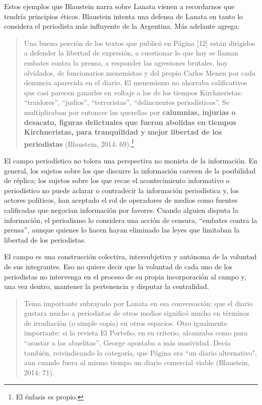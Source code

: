 {Estos ejemplos que Blaustein narra sobre Lanata vienen a recordarnos que tendría principios éticos. Blaustein intenta una defensa de Lanata en tanto lo considera el periodista más influyente de la Argentina. Más adelante agrega:

\begin{quote}
Una buena porción de los textos que publicó en Página {[}12{]} están dirigidos a defender la libertad de expresión, a cuestionar lo que hoy se llaman embates contra la prensa, a responder las agresiones brutales, hoy olvidados, de funcionarios menemistas y del propio Carlos Menen por cada denuncia aparecida en el diario. El menemismo no ahorraba calificativos que casi parecen ganarles en voltaje a los de los tiempos Kirchneristas: ``traidores'', ``judíos'', ``terroristas'', ``delincuentes periodísticos''. Se multiplicaban por entonces las querellas por \textbf{calumnias, injurias o desacato, figuras delictuales que fueron abolidas en tiempos Kirchneristas, para tranquilidad y mejor libertad de los periodistas} (Blaustein, 2014: 69).\footnote{El énfasis es propio.}
\end{quote}

El campo periodístico no tolera una perspectiva no monista de la información. En general, los sujetos sobre los que discurre la información carecen de la posibilidad de réplica; los sujetos sobre los que recae el acontecimiento informativo o periodístico no puede aclarar o contradecir la información periodística y, los actores políticos, han aceptado el rol de operadores de medios como fuentes calificadas que negocian información por favores. Cuando alguien disputa la información, el periodismo lo considera una acción de censura, ``embates contra la prensa'', aunque quienes lo hacen hayan eliminado las leyes que limitaban la libertad de los periodistas.

El campo es una construcción colectiva, intersubjetiva y autónoma de la voluntad de sus integrantes. Eso no quiere decir que la voluntad de cada uno de los periodistas no intervenga en el proceso de su propia incorporación al campo y, una vez dentro, mantener la pertenencia y disputar la centralidad.

\begin{quote}
Tema importante subrayado por Lanata en esa conversación: que el diario gustara mucho a periodistas de otros medios significó mucho en términos de irradiación (o simple copia) en otros espacios. Otro igualmente importante: si la revista El Porteño, en su criterio, alcanzaba como para ``asustar a las abuelitas'', George apostaba a más masividad. Decía también, reivindicando la categoría, que Página era ``un diario alternativo", aun cuando fuera al mismo tiempo un diario comercial viable (Blaustein, 2014: 71).
\end{quote}

}
